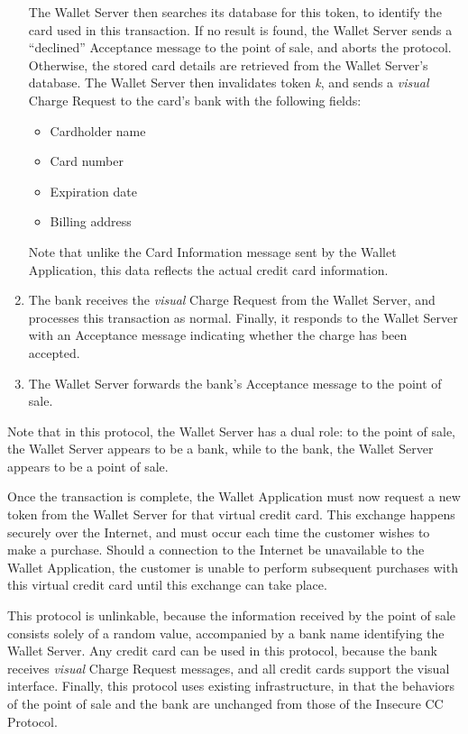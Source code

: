 \begin{enumerate}
    The Wallet Server then searches its database for this token, to identify the card used in this transaction.
    If no result is found, the Wallet Server sends a ``declined'' Acceptance message to the point of sale, and aborts the protocol.
    Otherwise, the stored card details are retrieved from the Wallet Server's database.
    The Wallet Server then invalidates token \emph{k}, and sends a \emph{visual} Charge Request to the card's bank with the following fields:
    \begin{itemize}
    \item Cardholder name
    \item Card number
    \item Expiration date
    \item Billing address
    \end{itemize}
    Note that unlike the Card Information message sent by the Wallet Application, this data reflects the actual credit card information.
\item The bank receives the \emph{visual} Charge Request from the Wallet Server,
    and processes this transaction as normal.
    Finally, it responds to the Wallet Server with an Acceptance message indicating whether the charge has been accepted.
\item The Wallet Server forwards the bank's Acceptance message to the point of sale.
\end{enumerate}

Note that in this protocol, the Wallet Server has a dual role:
to the point of sale, the Wallet Server appears to be a bank, while to the bank, the Wallet Server appears to be a point of sale.

Once the transaction is complete, the Wallet Application must now request a new token from the Wallet Server for that virtual credit card.
This exchange happens securely over the Internet, and must occur each time the customer wishes to make a purchase.
Should a connection to the Internet be unavailable to the Wallet Application,
    the customer is unable to perform subsequent purchases with this virtual credit card until this exchange can take place.

This protocol is unlinkable,
    because the information received by the point of sale consists solely of a random value, accompanied by a bank name identifying the Wallet Server.
Any credit card can be used in this protocol,
    because the bank receives \emph{visual} Charge Request messages, and all credit cards support the visual interface.
Finally, this protocol uses existing infrastructure,
    in that the behaviors of the point of sale and the bank are unchanged from those of the Insecure CC Protocol.
